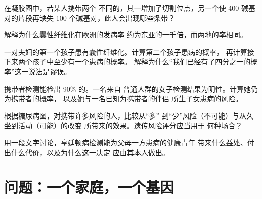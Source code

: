 \begin{exercise}[$\star\star$]\label{exo:g11:genes-and-disease:10}
在凝胶图中，若某人携带两个
不同的，其一增加了切割位点，另一个使
400 碱基对的片段再缺失 100 个碱基对，此人会出现哪些条带？
\end{exercise}

\begin{exercise}[$\star\star$]\label{exo:g11:genes-and-disease:11}
解释为什么囊性纤维化在欧洲的发病率
约为东亚的一千倍，而两地的率相同。
\end{exercise}

\begin{exercise}[$\star\star\star$]\label{exo:g11:genes-and-disease:12}
一对夫妇的第一个孩子患有囊性纤维化。计算第二个孩子患病的概率，
再计算接下来两个孩子中至少有一个患病的概率。
解释为什么“我们已经有了四分之一的概率”这一说法是谬误。
\end{exercise}

\begin{exercise}[$\star\star\star$]\label{exo:g11:genes-and-disease:13}
携带者检测能检出 90\% 的。一名来自
普通人群的女子检测结果为阴性。计算她仍为携带者的概率，
以及她与一名已知为携带者的伴侣
所生子女患病的风险。
\end{exercise}

\begin{exercise}[$\star\star\star$]\label{exo:g11:genes-and-disease:14}
根据糖尿病图，对携带许多风险的人，比较从“多”
到“少”风险（不可能）与从久坐到活动（可能）的改变
所带来的效果。遗传风险评分应当用于
何种场合？
\end{exercise}

\begin{exercise}[$\star\star\star$]\label{exo:g11:genes-and-disease:15}
用一段文字讨论，亨廷顿病检测能为父母一方患病的健康青年
带来什么益处、付出什么代价，以及为什么这一决定
应由其本人做出。
\end{exercise}

\section{问题：一个家庭，一个基因}

